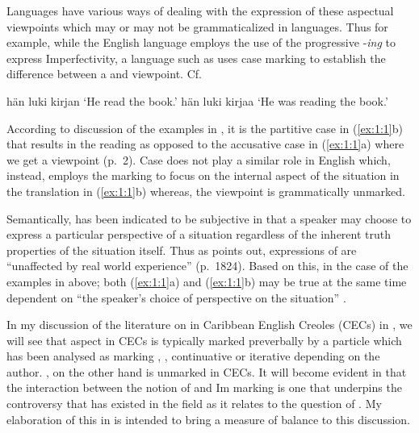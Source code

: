 Languages have various ways of dealing with the expression of these aspectual
viewpoints which may or may not be grammaticalized in languages.  Thus for
example, while the English language employs the use of the progressive
-\textit{ing} to express Imperfectivity, a language such as  uses case
marking to establish the difference between a  and 
viewpoint.  
Cf. \largerpage

\ea\label{ex:1:1}  \citep[8]{Comrie1976}
  \ea hän luki kirjan
  \glt `He read the book.'
  \ex hän luki kirjaa
  \glt `He was reading the book.'
  \z
\z

According to \citet{Travis2010} discussion of the  examples in
, it is the partitive case in (\ref{ex:1:1}b) that results in the
 reading as opposed to the accusative case in (\ref{ex:1:1}a) where
we get a  viewpoint (p.~2).  Case does not play a similar role in
English which, instead, employs the  marking to focus on the internal
aspect of the situation in the translation in (\ref{ex:1:1}b) whereas, the 
viewpoint is grammatically unmarked.

Semantically,  has been indicated to be subjective in that a
speaker may choose to express a particular perspective of a situation regardless
of the inherent truth properties of the situation itself. Thus as
\citet{Guéron2008} points out, expressions of  are ``unaffected
by real world experience'' (p.~1824). Based on this, in the case of the
examples in  above; both (\ref{ex:1:1}a) and (\ref{ex:1:1}b) may be
true at the same time dependent on ``the speaker's choice of perspective on the
situation'' \citep[479]{Smith1983}.

In my discussion of the literature on  in Caribbean English
Creoles (CECs) in , we will see that  aspect in CECs
is typically marked preverbally by a particle which has been analysed as marking
, , continuative or iterative depending on the author.
, on the other hand is unmarked in CECs. It will become evident in
 that the interaction between the notion of  and
Im marking is one that underpins the controversy that has
existed in the field as it relates to the question of . My elaboration
of this in  is intended to bring a measure of balance to this
discussion.

